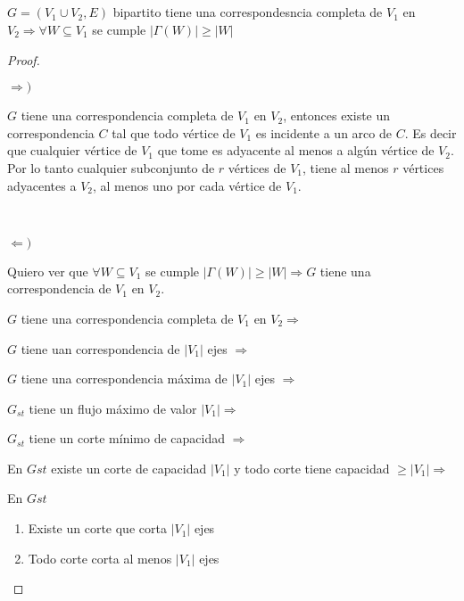 \setcounter{subsection}{8}
\subsection{}

\setcounter{subsubsection}{1}
\subsubsection{}

$G = (V_1 \cup V_2, E)$ bipartito tiene una correspondesncia completa de $V_1$ en $V_2 \Longrightarrow \forall W \subseteq V_1$ se cumple $|\Gamma(W)| \geq |W|$

\begin{proof}

	~

	$\Longrightarrow )$

	$G$ tiene una correspondencia completa de $V_1$ en $V_2$, entonces existe
	un correspondencia $C$ tal que todo vértice de $V_1$ es incidente a un
	arco de $C$. Es decir que cualquier vértice de $V_1$ que tome es adyacente
	al menos a algún vértice de $V_2$. Por lo tanto cualquier subconjunto de
	$r$ vértices de $V_1$, tiene al menos $r$ vértices adyacentes a $V_2$, al
	menos uno por cada vértice de $V_1$.

	~

	$\Longleftarrow )$

	Quiero ver que $\forall W \subseteq V_1$ se cumple $|\Gamma(W)| \geq |W| \Longrightarrow G$ tiene una correspondencia de $V_1$ en $V_2$.

	$G$ tiene una correspondencia completa de $V_1$ en $V_2 \Longrightarrow$

	$G$ tiene uan correspondencia de $|V_1|$ ejes $\Longrightarrow$

	$G$ tiene una correspondencia máxima de $|V_1|$ ejes $\Longrightarrow$

	$G_{st}$ tiene un flujo máximo de valor $|V_1| \Longrightarrow$

	$G_{st}$ tiene un corte mínimo de capacidad $\Longrightarrow$

	En $G{st}$ existe un corte de capacidad $|V_1|$ y todo corte tiene
	capacidad $\geq |V_1| \Longrightarrow$

	En $G{st}$ \begin{enumerate}
		\item Existe un corte que corta $|V_1|$ ejes
		\item Todo corte corta al menos $|V_1|$ ejes
	\end{enumerate}


\end{proof}
